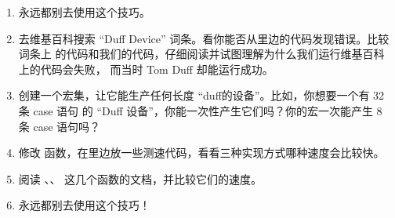 \begin{enumerate}
\item 永远都别去使用这个技巧。

\item 去维基百科搜索 “Duff Device” 词条。看你能否从里边的代码发现错误。比较词条上
    的代码和我们的代码，仔细阅读并试图理解为什么我们运行维基百科上的代码会失败，
    而当时 Tom Duff 却能运行成功。

\item 创建一个宏集，让它能生产任何长度 “duff的设备”。比如，你想要一个有 32 条 case 语句
	的 “Duff 设备”，你能一次性产生它们吗？你的宏一次能产生 8 条 case 语句吗？

\item 修改  函数，在里边放一些测速代码，看看三种实现方式哪种速度会比较快。

\item 阅读 、、 这几个函数的文档，并比较它们的速度。

\item 永远都别去使用这个技巧！
\end{enumerate}
